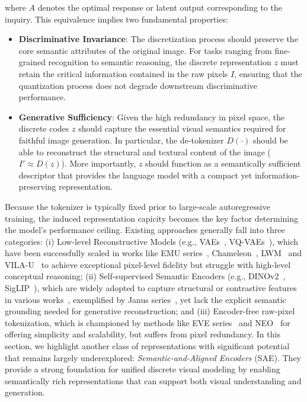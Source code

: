 \documentclass{article}
\begin{document}
where $A$ denotes the optimal response or latent output corresponding to the inquiry. This equivalence implies two fundamental properties:

\begin{itemize}

\item \textbf{Discriminative Invariance}: The discretization process should preserve the core semantic attributes of the original image. For tasks ranging from fine-grained recognition to semantic reasoning, the discrete representation $z$ must retain the critical information contained in the raw pixels $I$, ensuring that the quantization process does not degrade downstream discriminative performance.

\item \textbf{Generative Sufficiency}: Given the high redundancy in pixel space, the discrete codes $z$ should capture the essential visual semantics required for faithful image generation. In particular, the de-tokenizer $D(\cdot)$ should be able to reconstruct the structural and textural content of the image ($I' \approx D(z)$). More importantly, $z$ should function as a semantically sufficient descriptor that provides the language model with a compact yet information-preserving representation.

\end{itemize}




Because the tokenizer is typically fixed prior to large-scale autoregressive training, the induced representation capicity becomes the key factor determining the model’s performance ceiling.
Existing approaches generally fall into three categories: (i) Low-level Reconstructive Models (e.g., VAEs~\cite{kingma2013auto}, VQ-VAEs~\cite{van2017neural}), which have been successfully scaled in works like EMU series~\cite{wang2024emu3,cui2025emu3}, Chameleon~\cite{team2024chameleon}, LWM~\cite{liu2024world} and VILA-U~\cite{wu2024vila} to achieve exceptional pixel-level fidelity but struggle with high-level conceptual reasoning; (ii) Self-supervised Semantic Encoders (e.g., DINOv2~\cite{oquab2023dinov2}, SigLIP~\cite{zhai2023sigmoid}), which are widely adopted to capture structural or contrastive features in various works~\cite{jiao2025unitoken,fan2025unified,zou2025omnimamba,deng2025emergingpropertiesunifiedmultimodal}, exemplified by Janus series~\cite{wu2025janus,chen2025janus}, yet lack the explicit semantic grounding needed for generative reconstruction; and (iii) Encoder-free raw-pixel tokenization, which is championed by methods like EVE series~\cite{diao2024unveiling,diao2025evev2} and NEO~\cite{diao2025pixels} for offering simplicity and scalability, but suffers from pixel redundancy. In this section, we highlight another class of representations with significant potential that remains largely underexplored: \textit{Semantic-and-Aligned Encoders} (SAE). 
They provide a strong foundation for unified discrete visual modeling by enabling semantically rich representations that can support both visual understanding and generation.
\end{document}
